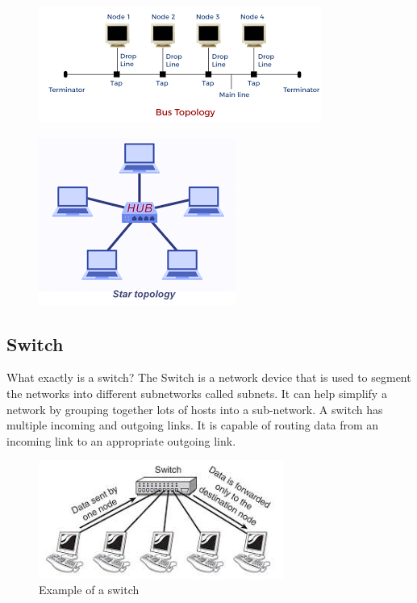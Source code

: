 \documentclass[12pt]{article}
\begin{document}
\begin{figure}
    \centering
    \begin{minipage}{.5\textwidth}
      \centering
      \includegraphics[width=0.9\linewidth]{Diagrams/bus.png}
      \label{fig:test1}
    \end{minipage}%
    \begin{minipage}{.5\textwidth}
      \centering
      \includegraphics[width=.45\linewidth]{Diagrams/star.png}
      \label{fig:test2}
    \end{minipage}
\end{figure}


\subsection{Switch}
What exactly is a switch? The Switch is a network device that is used to segment the networks into different subnetworks called subnets. It can help simplify a 
network by grouping together lots of hosts into a sub-network. A switch has multiple incoming and outgoing links. It is capable of 
routing data from an incoming link to an appropriate outgoing link.

\begin{figure}[H]
    
    \begin{center}
    \includegraphics[width = 8cm]{Diagrams/switch.jpeg}
    \end{center}
    \label{fig:switch}
    \caption{Example of a switch}
\end{figure}
\end{document}
